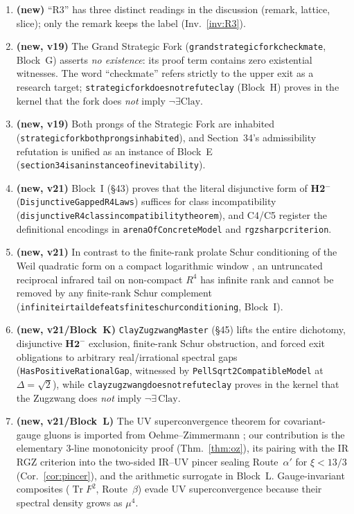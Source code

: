 \documentclass[11pt,a4paper]{article}
\def\R{R}\def\N{N}\def\Q{Q}\def\Z{Z}\def\Class{C}\def\OS{OS}\def\Gap{Gap}%
\theoremstyle{plain}
\theoremstyle{definition}
\theoremstyle{remark}
\newcommand{\R}{\mathbb{R}}\newcommand{\N}{\mathbb{N}}\newcommand{\Q}{\mathbb{Q}}
\newcommand{\Z}{\mathbb{Z}}\newcommand{\Spec}{\operatorname{Spec}}
\newcommand{\OS}{\mathrm{OS}}\newcommand{\Gap}{\mathrm{Gap}}
\newcommand{\Class}{\mathcal{C}}\newcommand{\Htot}{\mathcal{H}}
\renewcommand{\_}{\oldunderscore\allowbreak}
\newcommand{\Lean}[1]{\texttt{\small #1}}
\begin{document}
\begin{enumerate}[label=\textbf{I\arabic*.},leftmargin=30pt,itemsep=1pt]
\item \textbf{(new)} ``R3'' has three distinct readings in the discussion (remark, lattice,
slice); only the remark keeps the label (Inv.~\ref{inv:R3}).
\item \textbf{(new, v19)} The Grand Strategic Fork (\Lean{grand\_strategic\_fork\_checkmate}, Block~G)
asserts \emph{no existence}: its proof term contains zero existential witnesses. The word
``checkmate'' refers strictly to the upper exit as a research target;
\Lean{strategic\_fork\_does\_not\_refute\_clay} (Block~H) proves in the kernel that the fork
does \emph{not} imply $\neg\exists\mathrm{Clay}$.
\item \textbf{(new, v19)} Both prongs of the Strategic Fork are inhabited
(\Lean{strategic\_fork\_both\_prongs\_inhabited}), and Section~34's admissibility refutation is
unified as an instance of Block~E (\Lean{section34\_is\_an\_instance\_of\_inevitability}).
\item \textbf{(new, v21)} Block~I (\S43) proves that the literal disjunctive form of \textbf{H2$^-$} (\Lean{DisjunctiveGappedR4Laws}) suffices for class incompatibility (\Lean{disjunctive\_R4\_class\_incompatibility\_theorem}), and C4/C5 register the definitional encodings in \Lean{arenaOfConcreteModel} and \Lean{rgz\_sharp\_criterion}.
\item \textbf{(new, v21)} In contrast to the finite-rank prolate Schur conditioning of the Weil quadratic form on a compact logarithmic window \cite{ConnesAndrewsLaGatta2026}, an untruncated reciprocal infrared tail on non-compact $\R^4$ has infinite rank and cannot be removed by any finite-rank Schur complement (\Lean{infinite\_ir\_tail\_defeats\_finite\_schur\_conditioning}, Block~I).
\item \textbf{(new, v21/Block~K)} \Lean{ClayZugzwangMaster} (\S45) lifts the entire dichotomy, disjunctive $\textbf{H2}^-$ exclusion, finite-rank Schur obstruction, and forced exit obligations to arbitrary real/irrational spectral gaps (\Lean{HasPositiveRationalGap}, witnessed by \Lean{PellSqrt2CompatibleModel} at $\Delta=\sqrt{2}$), while \Lean{clay\_zugzwang\_does\_not\_refute\_clay} proves in the kernel that the Zugzwang does \emph{not} imply $\neg\exists\,\mathrm{Clay}$.
\item \textbf{(new, v21/Block~L)} The UV superconvergence theorem for covariant-gauge gluons is imported from Oehme--Zimmermann \cite{OehmeZimmermann1980}; our contribution is the elementary 3-line monotonicity proof (Thm.~\ref{thm:oz}), its pairing with the IR RGZ criterion into the two-sided IR--UV pincer sealing Route~$\alpha'$ for $\xi<13/3$ (Cor.~\ref{cor:pincer}), and the arithmetic surrogate in Block~L. Gauge-invariant composites ($\operatorname{Tr}F^2$, Route~$\beta$) evade UV superconvergence because their spectral density grows as $\mu^4$.

\end{enumerate}
\end{document}

